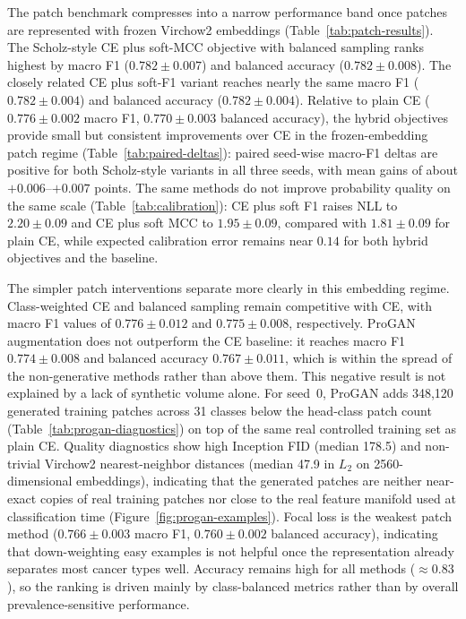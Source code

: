 \documentclass[11pt]{article}
\begin{document}
The patch benchmark compresses into a narrow performance band once patches are represented with frozen Virchow2 embeddings (Table~\ref{tab:patch-results}). The Scholz-style CE plus soft-MCC objective with balanced sampling ranks highest by macro F1 ($0.782 \pm 0.007$) and balanced accuracy ($0.782 \pm 0.008$). The closely related CE plus soft-F1 variant reaches nearly the same macro F1 ($0.782 \pm 0.004$) and balanced accuracy ($0.782 \pm 0.004$). Relative to plain CE ($0.776 \pm 0.002$ macro F1, $0.770 \pm 0.003$ balanced accuracy), the hybrid objectives provide small but consistent improvements over CE in the frozen-embedding patch regime (Table~\ref{tab:paired-deltas}): paired seed-wise macro-F1 deltas are positive for both Scholz-style variants in all three seeds, with mean gains of about $+0.006$--$+0.007$ points. The same methods do not improve probability quality on the same scale (Table~\ref{tab:calibration}): CE plus soft F1 raises NLL to $2.20 \pm 0.09$ and CE plus soft MCC to $1.95 \pm 0.09$, compared with $1.81 \pm 0.09$ for plain CE, while expected calibration error remains near $0.14$ for both hybrid objectives and the baseline.

The simpler patch interventions separate more clearly in this embedding regime. Class-weighted CE and balanced sampling remain competitive with CE, with macro F1 values of $0.776 \pm 0.012$ and $0.775 \pm 0.008$, respectively. ProGAN augmentation does not outperform the CE baseline: it reaches macro F1 $0.774 \pm 0.008$ and balanced accuracy $0.767 \pm 0.011$, which is within the spread of the non-generative methods rather than above them. This negative result is not explained by a lack of synthetic volume alone. For seed~0, ProGAN adds 348{,}120 generated training patches across 31 classes below the head-class patch count (Table~\ref{tab:progan-diagnostics}) on top of the same real controlled training set as plain CE. Quality diagnostics show high Inception FID (median 178.5) and non-trivial Virchow2 nearest-neighbor distances (median 47.9 in $L_2$ on 2560-dimensional embeddings), indicating that the generated patches are neither near-exact copies of real training patches nor close to the real feature manifold used at classification time (Figure~\ref{fig:progan-examples}). Focal loss is the weakest patch method ($0.766 \pm 0.003$ macro F1, $0.760 \pm 0.002$ balanced accuracy), indicating that down-weighting easy examples is not helpful once the representation already separates most cancer types well. Accuracy remains high for all methods ($\approx 0.83$), so the ranking is driven mainly by class-balanced metrics rather than by overall prevalence-sensitive performance.
\end{document}
